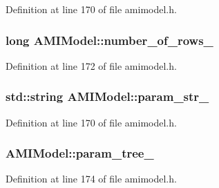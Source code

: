 Definition at line 170 of file amimodel.\+h.

\hypertarget{class_a_m_i_model_aaaf94b76a519e60318e1874bb190e9a8}{}
\subsubsection[{number\+\_\+of\+\_\+rows\+\_\+}]{\setlength{\rightskip}{0pt plus 5cm}long A\+M\+I\+Model\+::number\+\_\+of\+\_\+rows\+\_\+\hspace{0.3cm}{\ttfamily [protected]}}\label{class_a_m_i_model_aaaf94b76a519e60318e1874bb190e9a8}


Definition at line 172 of file amimodel.\+h.

\hypertarget{class_a_m_i_model_ab7aeef08245acc654271341cdf0139f9}{}
\subsubsection[{param\+\_\+str\+\_\+}]{\setlength{\rightskip}{0pt plus 5cm}std\+::string A\+M\+I\+Model\+::param\+\_\+str\+\_\+\hspace{0.3cm}{\ttfamily [protected]}}\label{class_a_m_i_model_ab7aeef08245acc654271341cdf0139f9}


Definition at line 170 of file amimodel.\+h.

\hypertarget{class_a_m_i_model_a4da53456e13a1224f2bb47396ab0ecbd}{}
\subsubsection[{param\+\_\+tree\+\_\+}]{ A\+M\+I\+Model\+::param\+\_\+tree\+\_\+\hspace{0.3cm}{\ttfamily [protected]}}\label{class_a_m_i_model_a4da53456e13a1224f2bb47396ab0ecbd}


Definition at line 174 of file amimodel.\+h.

\hypertarget{class_a_m_i_model_a4d4c286b04668c22f2e3f315715a6d5b}{}
